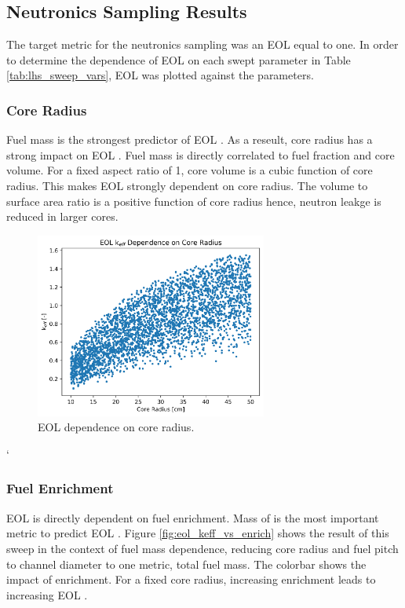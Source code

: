 \subsection{Neutronics Sampling Results}
The target metric for the neutronics sampling was an EOL \keff equal to one. In
order to determine the dependence of EOL \keff on each swept parameter in Table
\ref{tab:lhs_sweep_vars}, EOL \keff was plotted against the parameters.

\subsubsection{Core Radius}
Fuel mass is the strongest predictor of EOL \keff. As a reseult, core radius has a strong impact on EOL \keff. Fuel mass is directly correlated
to fuel fraction and core volume. For a fixed aspect ratio of 1, core volume is
a cubic function of core radius. This makes EOL \keff strongly dependent on core
radius. The volume to surface area ratio is a positive function of core radius
hence, neutron leakge is reduced in larger cores. 

\begin{figure}[h]
    \centering
    \includegraphics[width=3in]{../images/keff_vs_core_r.png}
\caption{EOL \keff dependence on core radius.}
\label{fig:eol_keff_vs_r_core}
\end{figure}`

\subsubsection{Fuel Enrichment}
EOL \keff is directly dependent on fuel enrichment. Mass of \uran is the most
important metric to predict EOL \keff. Figure
\ref{fig:eol_keff_vs_enrich} shows the result of this sweep in the context of
fuel mass dependence, reducing core radius and fuel pitch to channel diameter to
one metric, total fuel mass. The colorbar shows the impact of enrichment. For a fixed core
radius, increasing enrichment leads to increasing EOL \keff. 

